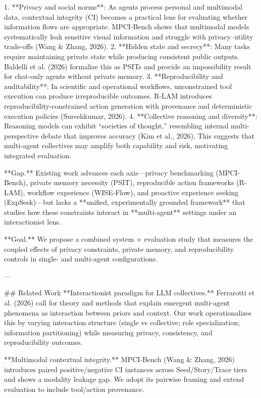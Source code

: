 1. **Privacy and social norms**: As agents process personal and multimodal data, contextual integrity (CI) becomes a practical lens for evaluating whether information flows are appropriate. MPCI-Bench shows that multimodal models systematically leak sensitive visual information and struggle with privacy–utility trade-offs (Wang & Zhang, 2026).  
2. **Hidden state and secrecy**: Many tasks require maintaining private state while producing consistent public outputs. Baldelli et al. (2026) formalize this as PSITs and provide an impossibility result for chat-only agents without private memory.  
3. **Reproducibility and auditability**: In scientific and operational workflows, unconstrained tool execution can produce irreproducible outcomes. R-LAM introduces reproducibility-constrained action generation with provenance and deterministic execution policies (Sureshkumar, 2026).  
4. **Collective reasoning and diversity**: Reasoning models can exhibit “societies of thought,” resembling internal multi-perspective debate that improves accuracy (Kim et al., 2026). This suggests that multi-agent collectives may amplify both capability and risk, motivating integrated evaluation.

**Gap.** Existing work advances each axis—privacy benchmarking (MPCI-Bench), private memory necessity (PSIT), reproducible action frameworks (R-LAM), workflow experience (WISE-Flow), and proactive experience seeking (ExpSeek)—but lacks a **unified, experimentally grounded framework** that studies how these constraints interact in **multi-agent** settings under an interactionist lens.

**Goal.** We propose a combined system + evaluation study that measures the coupled effects of privacy constraints, private memory, and reproducibility controls in single- and multi-agent configurations.

---

## Related Work  
**Interactionist paradigm for LLM collectives.** Ferrarotti et al. (2026) call for theory and methods that explain emergent multi-agent phenomena as interaction between priors and context. Our work operationalizes this by varying interaction structure (single vs collective; role specialization; information partitioning) while measuring privacy, consistency, and reproducibility outcomes.

**Multimodal contextual integrity.** MPCI-Bench (Wang & Zhang, 2026) introduces paired positive/negative CI instances across Seed/Story/Trace tiers and shows a modality leakage gap. We adopt its pairwise framing and extend evaluation to include tool/action provenance.

